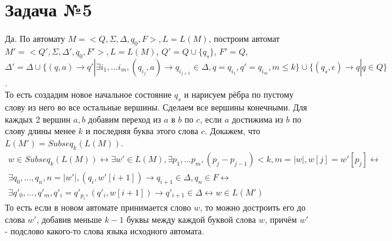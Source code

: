 \documentclass{article}
\begin{document}
     \section{Задача №5}
     Да. По автомату $M = <Q, \Sigma, \Delta, q_0, F>, L = L(M)$, построим автомат
     $M' = <Q', \Sigma, \Delta', q_0, F'>, L = L(M)$, 
     $Q' = Q \cup \{ q_s \}$,
     $F' = Q$,\\
     $\Delta' = \Delta \cup \{ (q, a) \rightarrow q' |
      \exists i_1, \ldots i_m, (q_{i_j}, a) \rightarrow q_{i_{j + 1}} \in \Delta,
       q = q_{i_1}, q' = q_{i_m}, m \leq k \} \cup \{ (q_s, \epsilon) \rightarrow q| q \in Q \} $.\\
     То есть создадим новое начальное состояние $q_s$ и нарисуем рёбра по пустому слову из него во все остальные вершины.
     Сделаем все вершины конечными. Для каждых 2 вершин $a, b$  добавим переход из $a$ в $b$ по $c$, если 
     $a$ достижима из $b$ по слову длины менее $k$ и последняя буква этого слова $c$.
     Докажем, что $L(M') = Subseq_k(L(M))$.\\
     \begin{multline}
     w \in Subseq_k(L(M)) \leftrightarrow \exists w' \in L(M), \exists p_1, \ldots p_m, (p_j - p_{j - 1}) < k, m = |w|, 
     w[j] = w'[p_j] \leftrightarrow \\
     \exists q_0, \ldots, q_n, n = |w'|, (q_i, w'[i + 1]) \rightarrow q_{i+1} \in \Delta, q_n \in F \leftrightarrow \\
     \exists q'_0, \ldots, q'_m, q'_i = q'_{p_i}, (q'_i, w[i + 1]) \rightarrow q'_{i+1} \in \Delta \leftrightarrow 
     w \in L(M')
     \end{multline}
     То есть если в новом автомате принимается слово $w$, то можно достроить его до слова $w'$, 
     добавив меньше $k-1$ буквы между каждой буквой слова $w$, причём $w'$ - подслово какого-то слова языка исходного
     автомата.
\end{document}
